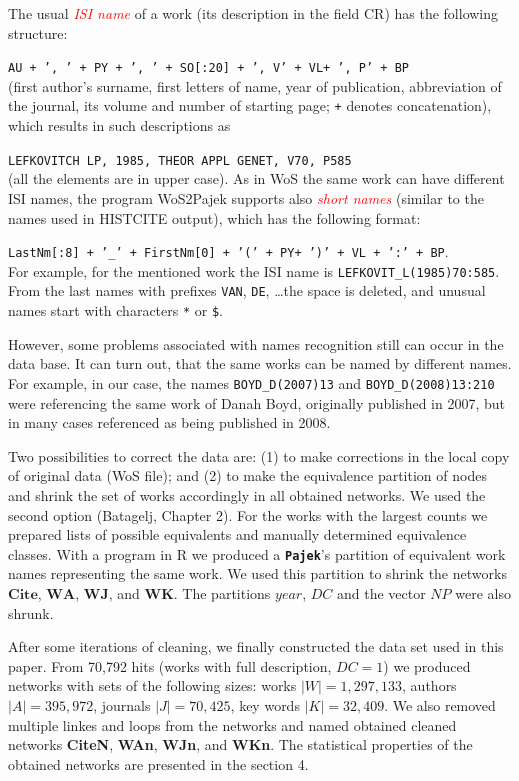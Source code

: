 \documentclass[11pt]{article} %
\newcommand{\Pajek}{\texttt{\textbf{Pajek}}\xspace}
\newcommand{\keyw}[1]{\textcolor{red}{\emph{#1}}}
\newcommand{\WA}{\mathbf{W\!\!A}}
\newcommand{\WK}{\mathbf{W\!K}}
\newcommand{\WJ}{\mathbf{W\!J}}
\newcommand{\Ci}{\mathbf{Cite}}
\newcommand{\NP}{N\!P}
\newcommand{\Remark}[1]{\ifodd\value{page} \normalmarginpar
 \else \reversemarginpar \fi \marginpar{{\footnotesize #1}} }
\begin{document}
The usual \keyw{ISI name} of a work (its description in the field CR) has the following structure: \smallskip
 
 \texttt {AU {+ ', ' +} PY \texttt{+ ', ' +} SO[:20] \texttt{+ ', V' +} VL\texttt{+ ', P' +} BP}  \smallskip\\
(first author's surname, first letters of name, year of publication, abbreviation of the journal, its volume and number of starting page; \texttt{+} denotes concatenation), which results in such descriptions as \Remark{other example ?}\smallskip

\texttt{LEFKOVITCH LP, 1985, THEOR APPL GENET, V70, P585}\smallskip\\  (all the elements are in upper case). As in WoS the same work can have different ISI names, the  program WoS2Pajek supports also \keyw{short names} (similar to the names used in HISTCITE output), which has the following format:\smallskip

 \texttt {LastNm[:8] \texttt{+ '\_' +} FirstNm[0] \texttt{+ '(' +} PY\texttt{+ ')' +} VL \texttt{+ ':' +} BP}. \smallskip\\ For example, for the mentioned work the ISI name is \texttt{LEFKOVIT\_L(1985)70:585}. From the last names with prefixes \texttt{VAN}, \texttt{DE}, \ldots the space is deleted, and unusual names start with characters \texttt{*} or \texttt{\$}.\medskip 

However, some problems associated with names recognition still can occur in the data base. It can turn out, that the same works can be named by different names. For example, in our case, the names \texttt {BOYD\_D(2007)13} and \texttt {BOYD\_D(2008)13:210} were referencing the same work of Danah Boyd, originally published in 2007, but in many cases referenced as being published in 2008. \medskip 

Two possibilities to correct the data are: (1) to make corrections in the local copy of original data (WoS file); and (2) to make the equivalence partition of nodes and shrink the set of works accordingly in all  obtained networks. We used the second option (Batagelj, Chapter 2). For the works with the largest counts we prepared lists of possible equivalents and manually determined equivalence classes. With a program in R we produced a \Pajek's partition of equivalent work names representing the same work. We used this partition to shrink the networks $\Ci$, $\WA$, $\WJ$, and $\WK$. The partitions $year$,  $DC$ and the vector $\NP$ were also shrunk.  \medskip 

After some iterations of cleaning, we finally constructed the data set used in this paper. From 70,792 hits (works with full description, $DC=1$) we produced networks with sets of the following sizes: works $|W| = 1,297,133$, authors $|A| = 395,972$, journals $|J| = 70,425$, key words $|K| = 32,409$. We also removed multiple linkes and loops from the networks and named obtained cleaned networks \textbf{CiteN}, \textbf{WAn}, \textbf{WJn}, and \textbf{WKn}. The statistical properties of the obtained networks are presented in the section 4. \medskip  
\end{document}
